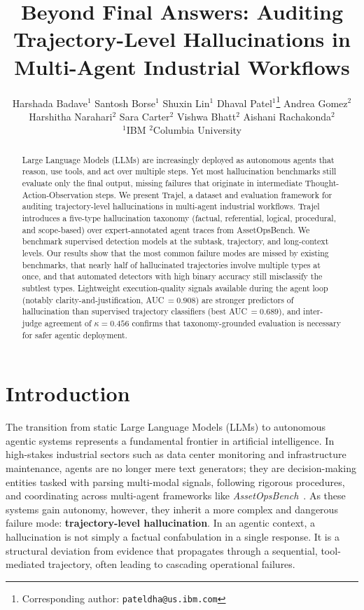 \documentclass{article}
\title{Beyond Final Answers: Auditing Trajectory-Level Hallucinations in Multi-Agent Industrial Workflows}
\author{%
  Harshada Badave$^{1}$ \quad Santosh Borse$^{1}$ \quad Shuxin Lin$^{1}$ \quad Dhaval Patel$^{1}$\thanks{Corresponding author: \texttt{pateldha@us.ibm.com}} \quad Andrea Gomez$^{2}$ \\
  Harshitha Narahari$^{2}$ \quad Sara Carter$^{2}$ \quad Vishwa Bhatt$^{2}$ \quad Aishani Rachakonda$^{2}$
  \\[1pt]
  $^{1}$IBM \quad $^{2}$Columbia University
}
\begin{document}
\maketitle

\begin{abstract}
Large Language Models (LLMs) are increasingly deployed as autonomous agents that reason, use tools, and act over multiple steps. Yet most hallucination benchmarks still evaluate only the final output, missing failures that originate in intermediate Thought-Action-Observation steps. We present Trajel, a dataset and evaluation framework for auditing trajectory-level hallucinations in multi-agent industrial workflows. Trajel introduces a five-type hallucination taxonomy (factual, referential, logical, procedural, and scope-based) over expert-annotated agent traces from AssetOpsBench. We benchmark supervised detection models at the subtask, trajectory, and long-context levels. Our results show that the most common failure modes are missed by existing benchmarks, that nearly half of hallucinated trajectories involve multiple types at once, and that automated detectors with high binary accuracy still misclassify the subtlest types. Lightweight execution-quality signals available during the agent loop (notably clarity-and-justification, AUC\,$=0.908$) are stronger predictors of hallucination than supervised trajectory classifiers (best AUC\,$=0.689$), and inter-judge agreement of $\kappa=0.456$ confirms that taxonomy-grounded evaluation is necessary for safer agentic deployment.
\end{abstract}

\section{Introduction}
\label{sec:intro}

The transition from static Large Language Models (LLMs) to autonomous agentic systems represents a fundamental frontier in artificial intelligence. In high-stakes industrial sectors such as data center monitoring and infrastructure maintenance, agents are no longer mere text generators; they are decision-making entities tasked with parsing multi-modal signals, following rigorous procedures, and coordinating across multi-agent frameworks like \emph{AssetOpsBench}~\cite{assetopsbench}. As these systems gain autonomy, however, they inherit a more complex and dangerous failure mode: \textbf{trajectory-level hallucination}. In an agentic context, a hallucination is not simply a factual confabulation in a single response. It is a structural deviation from evidence that propagates through a sequential, tool-mediated trajectory, often leading to cascading operational failures.
\end{document}
